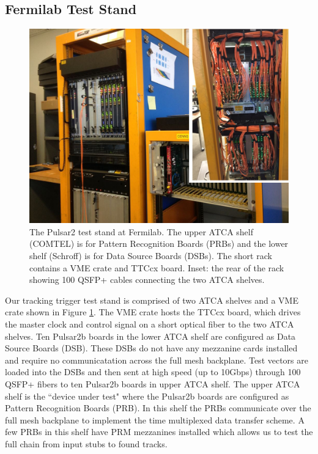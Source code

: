 \documentclass[letterpaper]{article}
\begin{document}
\subsection{Fermilab Test Stand}

\begin{figure}
\centering
\includegraphics[width=12cm]{teststand.jpg}
\caption{The Pulsar2 test stand at Fermilab.  The upper ATCA shelf (COMTEL) is for Pattern Recognition Boards (PRBs) and the lower shelf (Schroff) is for Data Source Boards (DSBs).  The short rack contains a VME crate and TTCcx board.  Inset: the rear of the rack showing 100 QSFP+ cables connecting the two ATCA shelves.}
\label{teststand_pic}
\end{figure}

Our tracking trigger test stand is comprised of two ATCA shelves and a VME crate shown in Figure \ref{teststand_pic}.  The VME crate hosts the TTCcx board, which drives the master clock and control signal on a short optical fiber to the two ATCA shelves.  Ten Pulsar2b boards in the lower ATCA shelf are configured as Data Source Boards (DSB).  These DSBs do not have any mezzanine cards installed and require no communicatation across the full mesh backplane.  Test vectors are loaded into the DSBs and then sent at high speed (up to 10Gbps) through 100 QSFP+ fibers to ten Pulsar2b boards in upper ATCA shelf.  The upper ATCA shelf is the ``device under test" where the Pulsar2b boards are configured as Pattern Recognition Boards (PRB).  In this shelf the PRBs communicate over the full mesh backplane to implement the time multiplexed data transfer scheme.  A few PRBs in this shelf have PRM mezzanines installed which allows us to test the full chain from input stubs to found tracks.
\end{document}
